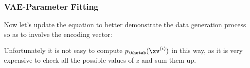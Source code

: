 


\begin{frame}
\frametitle{VAE-Parameter Fitting}
\vspace{2mm}

Now let's update the equation to better demonstrate the data generation process so as to involve the encoding vector:

\vspace{2mm}

\vspace{2mm}

Unfortunately it is not easy to compute $ p_{\thetab} (\xv^{(i)}) $ in this way, as it is very expensive to check all the possible values of $z$ and sum them up.
\end{frame}




